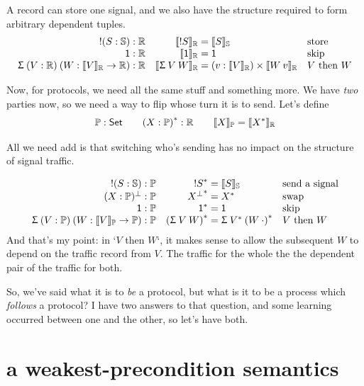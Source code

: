 \documentclass{book}
\newcommand{\D}[1]{\blue{\ensuremath{\mathsf{#1}}}}
\newcommand{\C}[1]{\red{\ensuremath{\mathsf{#1}}}}
\newcommand{\F}[1]{\green{\ensuremath{\mathrm{#1}}}}
\newcommand{\SET}{\D{\mathsf{Set}}}
\begin{document}
A record can store one signal, and we also have the structure required to form arbitrary dependent tuples.
\[\begin{array}{rr@{\;=\;}l@{\quad}l}
\send{(S:\Signal)} : \Record & \record{\send{S}} & \signal{S} & \mbox{store} \\
\C{1} : \Record & \record{\C{1}} & \D{1} & \mbox{skip} \\
\Sg{(V:\Record)}{(W:\record{V}\to\Record)} : \Record & \record{\Sg{V}{W}} & (v:\record{V})\times\record{W\:v} & \mbox{$V$ then $W$}
\end{array}\]

\newcommand{\preco}[1]{{#1}^{\F{\ast}}}
Now, for protocols, we need all the same stuff and something more.
We have \emph{two} parties now, so we need a way to flip whose turn it is to send. Let's define
\[
\Protocol : \SET \qquad \preco{(X : \Protocol)} : \Record \qquad
\protocol{X} = \record{\preco{X}}
\]

All we need add is that switching who's sending has no impact on
the structure of signal traffic.

\[\begin{array}{rr@{\;=\;}l@{\quad}l}
\send{(S:\Signal)} : \Protocol & \preco{\send{S}} & \signal{S} & \mbox{send a signal} \\
\op{(X:\Protocol)} : \Protocol & \preco{\op{X}} & \preco{X} & \mbox{swap} \\
\C{1} : \Protocol & \preco{\C{1}} & \C{1} & \mbox{skip} \\
\Sg{(V:\Protocol)}{(W:\protocol{V}\to\Protocol)} : \Protocol & \preco{(\Sg{V}{W})} & \Sg{\preco{V}}{\preco{(W\:\cdot)}}
 & \mbox{$V$ then $W$}
\end{array}\]
And that's my point: in `$V$ then $W$`, it makes sense to allow the subsequent $W$ to depend on the traffic record from $V$. The traffic for the whole the the dependent pair of the traffic for both.

So, we've said what it is to \emph{be} a protocol, but what is it to be a process which \emph{follows} a protocol? I have two answers to that question, and some learning occurred between one and the other, so let's have both.


\section{a weakest-precondition semantics}

\newcommand{\Play}[2]{\F{Protagonist}\:#1\:#2}
\newcommand{\Oppo}[2]{\F{Antagonist}\:#1\:#2}
\newcommand{\interact}[3]{\F{synthesis}\:#1\:#2\:#3}
\end{document}
